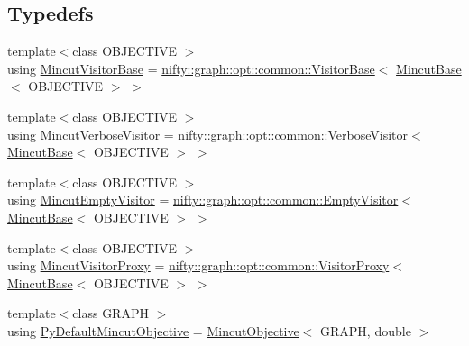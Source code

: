 \subsection*{Typedefs}
\begin{DoxyCompactItemize}
\item 
{\footnotesize template$<$class O\+B\+J\+E\+C\+T\+I\+VE $>$ }\\using \hyperlink{namespacenifty_1_1graph_1_1opt_1_1mincut_af5f9546254de453f964641e936ad8ba3}{Mincut\+Visitor\+Base} = \hyperlink{classnifty_1_1graph_1_1opt_1_1common_1_1VisitorBase}{nifty\+::graph\+::opt\+::common\+::\+Visitor\+Base}$<$ \hyperlink{classnifty_1_1graph_1_1opt_1_1mincut_1_1MincutBase}{Mincut\+Base}$<$ O\+B\+J\+E\+C\+T\+I\+VE $>$ $>$
\item 
{\footnotesize template$<$class O\+B\+J\+E\+C\+T\+I\+VE $>$ }\\using \hyperlink{namespacenifty_1_1graph_1_1opt_1_1mincut_add3f7a943158f70c24847778a52bd29a}{Mincut\+Verbose\+Visitor} = \hyperlink{classnifty_1_1graph_1_1opt_1_1common_1_1VerboseVisitor}{nifty\+::graph\+::opt\+::common\+::\+Verbose\+Visitor}$<$ \hyperlink{classnifty_1_1graph_1_1opt_1_1mincut_1_1MincutBase}{Mincut\+Base}$<$ O\+B\+J\+E\+C\+T\+I\+VE $>$ $>$
\item 
{\footnotesize template$<$class O\+B\+J\+E\+C\+T\+I\+VE $>$ }\\using \hyperlink{namespacenifty_1_1graph_1_1opt_1_1mincut_abaeb42be72a153c73386cda5564721b2}{Mincut\+Empty\+Visitor} = \hyperlink{classnifty_1_1graph_1_1opt_1_1common_1_1EmptyVisitor}{nifty\+::graph\+::opt\+::common\+::\+Empty\+Visitor}$<$ \hyperlink{classnifty_1_1graph_1_1opt_1_1mincut_1_1MincutBase}{Mincut\+Base}$<$ O\+B\+J\+E\+C\+T\+I\+VE $>$ $>$
\item 
{\footnotesize template$<$class O\+B\+J\+E\+C\+T\+I\+VE $>$ }\\using \hyperlink{namespacenifty_1_1graph_1_1opt_1_1mincut_ac0dd04b06e282faa322f3a967acf0347}{Mincut\+Visitor\+Proxy} = \hyperlink{classnifty_1_1graph_1_1opt_1_1common_1_1VisitorProxy}{nifty\+::graph\+::opt\+::common\+::\+Visitor\+Proxy}$<$ \hyperlink{classnifty_1_1graph_1_1opt_1_1mincut_1_1MincutBase}{Mincut\+Base}$<$ O\+B\+J\+E\+C\+T\+I\+VE $>$ $>$
\item 
{\footnotesize template$<$class G\+R\+A\+PH $>$ }\\using \hyperlink{namespacenifty_1_1graph_1_1opt_1_1mincut_a0580af1ea835f50c2c67e3903864ea08}{Py\+Default\+Mincut\+Objective} = \hyperlink{classnifty_1_1graph_1_1opt_1_1mincut_1_1MincutObjective}{Mincut\+Objective}$<$ G\+R\+A\+PH, double $>$
\end{DoxyCompactItemize}
